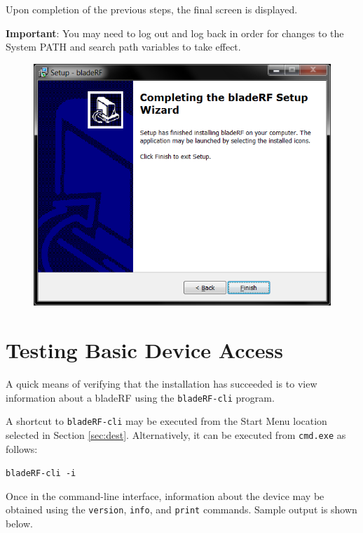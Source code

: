 {Upon completion of the previous steps, the final screen is displayed.

\textbf{Important}: You may need to log out and log back in order for
changes to the System PATH and \matlab search path variables to take effect.

\begin{figure}[h]
  \centering
  \includegraphics{images/windows/installer/11-complete.png}
\end{figure}

\newpage
\section{Testing Basic Device Access}

A quick means of verifying that the installation has succeeded is to
view information about a bladeRF using the \texttt{bladeRF-cli} program.

A shortcut to \texttt{bladeRF-cli} may be executed from the Start Menu
location selected in Section \ref{sec:dest}.  Alternatively, it can
be executed from \texttt{cmd.exe} as follows:

\centerline{\texttt{bladeRF-cli -i}}

Once in the command-line interface, information about the
device may be obtained using the \texttt{version}, \texttt{info},
and \texttt{print} commands. Sample output is shown below.

}
